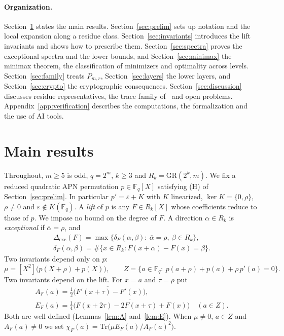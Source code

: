 \documentclass[11pt]{article}
\theoremstyle{definition}
\theoremstyle{remark}
\newcommand{\F}{\mathbb{F}}
\newcommand{\GR}{\mathrm{GR}}
\newcommand{\Tr}{\mathrm{Tr}}
\newcommand{\ol}[1]{\overline{#1}}
\newcommand{\Dexc}{\Delta_{\mathrm{exc}}}
\begin{document}
\paragraph{Organization.}
Section~\ref{sec:main} states the main results. Section~\ref{sec:prelim} sets up notation and the local expansion along a
residue class. Section~\ref{sec:invariants} introduces the lift invariants and shows how to prescribe them.
Section~\ref{sec:spectra} proves the exceptional spectra and the lower bounds, and Section~\ref{sec:minimax} the minimax
theorem, the classification of minimizers and optimality across levels. Section~\ref{sec:family} treats $P_{m,r}$,
Section~\ref{sec:layers} the lower layers, and Section~\ref{sec:crypto} the cryptographic consequences.
Section~\ref{sec:discussion} discusses residue representatives, the trace family of~\cite{BS} and open problems.
Appendix~\ref{app:verification} describes the computations, the formalization and the use of AI tools.

\section{Main results}\label{sec:main}

Throughout, $m\ge5$ is odd, $q=2^m$, $k\ge3$ and $R_k=\GR(2^k,m)$. We fix a reduced quadratic APN
permutation $p\in\F_q[X]$ satisfying (H) of Section~\ref{sec:prelim}. In particular $p'=\varepsilon+K$ with $K$
linearized, $\ker K=\{0,\rho\}$, $\rho\ne0$ and $\varepsilon\notin K(\F_q)$. A \emph{lift} of $p$ is any
$F\in R_k[X]$ whose coefficients reduce to those of $p$. We impose no bound on the degree of $F$. A direction
$\alpha\in R_k$ is \emph{exceptional} if $\ol\alpha=\rho$, and
\begin{gather*}
  \Dexc(F)=\max\{\delta_F(\alpha,\beta):\ \ol\alpha=\rho,\ \beta\in R_k\},\\
  \delta_F(\alpha,\beta)=\#\{x\in R_k: F(x+\alpha)-F(x)=\beta\}.
\end{gather*}
Two invariants depend only on $p$:
\[
  \mu=[X^2]\bigl(p(X+\rho)+p(X)\bigr),\qquad
  Z=\{a\in\F_q:\ p(a+\rho)+p(a)+\rho\,p'(a)=0\}.
\]
Two invariants depend on the lift. For $\ol x=a$ and $\ol\tau=\rho$ put
\begin{gather*}
  A_F(a)=\ol{\tfrac12\bigl(F'(x+\tau)-F'(x)\bigr)},\\
  E_F(a)=\ol{\tfrac14\bigl(F(x+2\tau)-2F(x+\tau)+F(x)\bigr)}\quad(a\in Z).
\end{gather*}
Both are well defined (Lemmas~\ref{lem:A} and~\ref{lem:E}). When $\mu\ne0$, $a\in Z$ and $A_F(a)\ne0$ we set
$\chi_F(a)=\Tr\bigl(\mu E_F(a)/A_F(a)^2\bigr)$.
\end{document}
